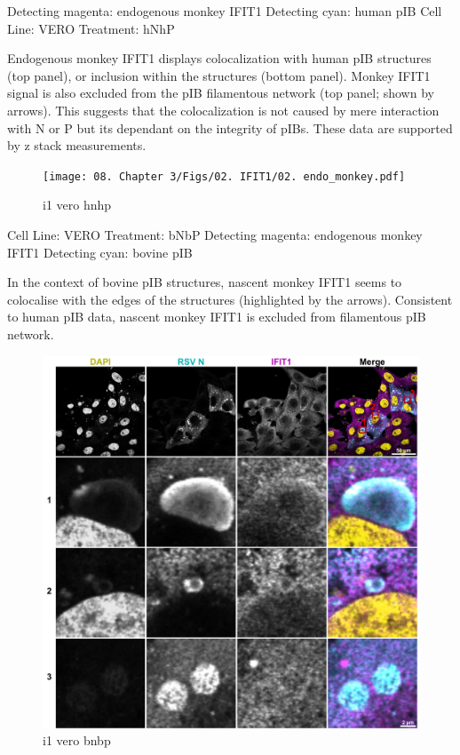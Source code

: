 Detecting magenta: endogenous monkey IFIT1 \newline
Detecting cyan: human pIB \newline
Cell Line: VERO \newline
Treatment: hNhP \newline

Endogenous monkey IFIT1 displays colocalization with human pIB structures (top panel), or inclusion within the structures (bottom panel). Monkey IFIT1 signal is also excluded from the pIB filamentous network (top panel; shown by arrows). This suggests that the colocalization is not caused by mere interaction with N or P but its dependant on the integrity of pIBs. These data are supported by z stack measurements.  

\begin{figure}
    \centering
    \texttt{[image: 08. Chapter 3/Figs/02. IFIT1/02. endo\_monkey.pdf]}
    \caption[i1 vero hnhp]{i1 vero hnhp}
    \label{i1 vero hnhp}
\end{figure}


Cell Line: VERO \newline
Treatment: bNbP \newline
Detecting magenta: endogenous monkey IFIT1 \newline
Detecting cyan: bovine pIB \newline

In the context of bovine pIB structures, nascent monkey IFIT1 seems to colocalise with the edges of the structures (highlighted by the arrows). Consistent to human pIB data, nascent monkey IFIT1 is excluded from filamentous pIB network.


\begin{figure}
    \centering
    \includegraphics[width=1\linewidth]{08. Chapter 3/Figs/02. IFIT1/03. endo_monkey_bovine-pIB.pdf}
    \caption[i1 vero bnbp]{i1 vero bnbp}
    \label{i1 vero bnbp}
\end{figure}

